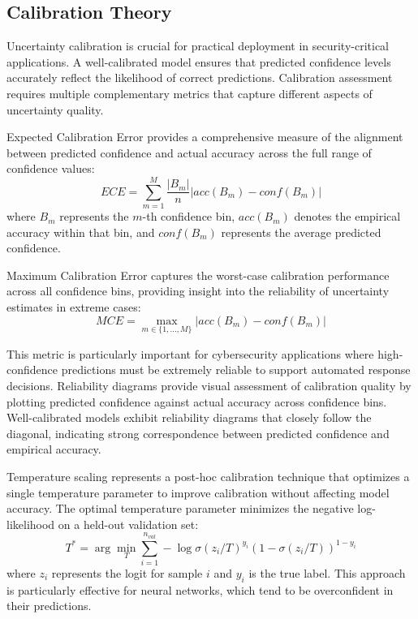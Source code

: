 \documentclass[journal]{IEEEtran}
\begin{document}
\subsection{Calibration Theory}

Uncertainty calibration is crucial for practical deployment in security-critical applications. A well-calibrated model ensures that predicted confidence levels accurately reflect the likelihood of correct predictions. Calibration assessment requires multiple complementary metrics that capture different aspects of uncertainty quality.

Expected Calibration Error provides a comprehensive measure of the alignment between predicted confidence and actual accuracy across the full range of confidence values:
\begin{equation}
ECE = \sum_{m=1}^M \frac{|B_m|}{n} |acc(B_m) - conf(B_m)|
\end{equation}
where $B_m$ represents the $m$-th confidence bin, $acc(B_m)$ denotes the empirical accuracy within that bin, and $conf(B_m)$ represents the average predicted confidence.

Maximum Calibration Error captures the worst-case calibration performance across all confidence bins, providing insight into the reliability of uncertainty estimates in extreme cases:
\begin{equation}
MCE = \max_{m \in \{1,...,M\}} |acc(B_m) - conf(B_m)|
\end{equation}

This metric is particularly important for cybersecurity applications where high-confidence predictions must be extremely reliable to support automated response decisions. Reliability diagrams provide visual assessment of calibration quality by plotting predicted confidence against actual accuracy across confidence bins. Well-calibrated models exhibit reliability diagrams that closely follow the diagonal, indicating strong correspondence between predicted confidence and empirical accuracy.

Temperature scaling represents a post-hoc calibration technique that optimizes a single temperature parameter to improve calibration without affecting model accuracy. The optimal temperature parameter minimizes the negative log-likelihood on a held-out validation set:
\begin{equation}
T^* = \arg\min_T \sum_{i=1}^{n_{val}} -\log \sigma(z_i/T)^{y_i} (1-\sigma(z_i/T))^{1-y_i}
\end{equation}
where $z_i$ represents the logit for sample $i$ and $y_i$ is the true label. This approach is particularly effective for neural networks, which tend to be overconfident in their predictions.
\end{document}
